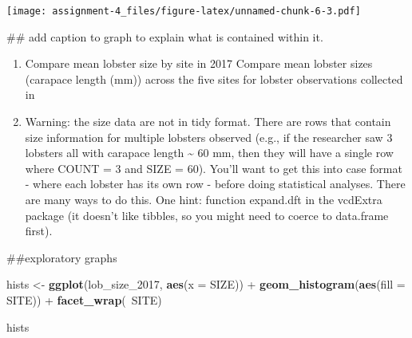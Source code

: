 \documentclass[]{article}
\newenvironment{Shaded}{\begin{snugshade}}{\end{snugshade}}
\newcommand{\KeywordTok}[1]{\textcolor[rgb]{0.13,0.29,0.53}{\textbf{{#1}}}}
\newcommand{\DataTypeTok}[1]{\textcolor[rgb]{0.13,0.29,0.53}{{#1}}}
\newcommand{\DecValTok}[1]{\textcolor[rgb]{0.00,0.00,0.81}{{#1}}}
\newcommand{\StringTok}[1]{\textcolor[rgb]{0.31,0.60,0.02}{{#1}}}
\newcommand{\NormalTok}[1]{{#1}}
\providecommand{\tightlist}{%
  \setlength{\itemsep}{0pt}\setlength{\parskip}{0pt}}
\begin{document}
\texttt{[image: assignment-4\_files/figure-latex/unnamed-chunk-6-3.pdf]}

\begin{Shaded}
\begin{Highlighting}[]
\NormalTok{## add caption to graph to explain what is contained within it. }
\end{Highlighting}
\end{Shaded}

\begin{enumerate}
\def\labelenumi{\arabic{enumi}.}
\setcounter{enumi}{1}
\tightlist
\item
  Compare mean lobster size by site in 2017 Compare mean lobster sizes
  (carapace length (mm)) across the five sites for lobster observations
  collected in
\item
  Warning: the size data are not in tidy format. There are rows that
  contain size information for multiple lobsters observed (e.g., if the
  researcher saw 3 lobsters all with carapace length \textasciitilde{}
  60 mm, then they will have a single row where COUNT = 3 and SIZE =
  60). You'll want to get this into case format - where each lobster has
  its own row - before doing statistical analyses. There are many ways
  to do this. One hint: function expand.dft in the vcdExtra package (it
  doesn't like tibbles, so you might need to coerce to data.frame
  first).
\end{enumerate}

\begin{Shaded}
\end{Shaded}

\begin{Shaded}
\begin{Highlighting}[]
\NormalTok{##exploratory graphs}

\NormalTok{hists <-}\StringTok{ }\KeywordTok{ggplot}\NormalTok{(lob_size_2017, }\KeywordTok{aes}\NormalTok{(}\DataTypeTok{x =} \NormalTok{SIZE)) +}
\StringTok{  }\KeywordTok{geom_histogram}\NormalTok{(}\KeywordTok{aes}\NormalTok{(}\DataTypeTok{fill =} \NormalTok{SITE)) +}\StringTok{ }
\StringTok{  }\KeywordTok{facet_wrap}\NormalTok{(~SITE)}

\NormalTok{hists}
\end{Highlighting}
\end{Shaded}
\end{document}
